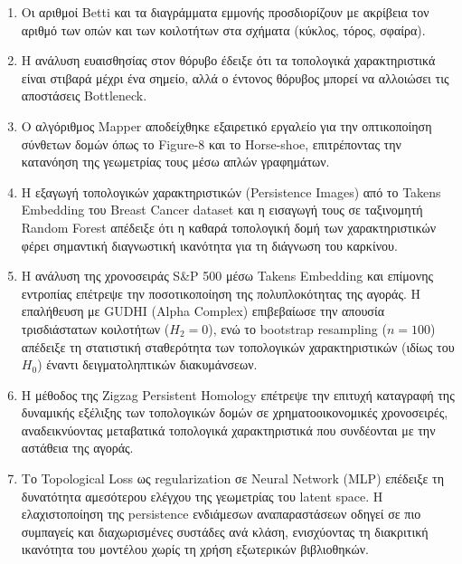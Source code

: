 \documentclass[12pt]{article}
\newcommand{\en}[1]{\foreignlanguage{english}{#1}}
\begin{document}
\begin{enumerate}
    \item Οι αριθμοί \foreignlanguage{english}{Betti} και τα διαγράμματα εμμονής προσδιορίζουν με ακρίβεια τον αριθμό των οπών και των κοιλοτήτων στα σχήματα (κύκλος, τόρος, σφαίρα).
    \item Η ανάλυση ευαισθησίας στον θόρυβο έδειξε ότι τα τοπολογικά χαρακτηριστικά είναι στιβαρά μέχρι ένα σημείο, αλλά ο έντονος θόρυβος μπορεί να αλλοιώσει τις αποστάσεις \foreignlanguage{english}{Bottleneck}.
    \item Ο αλγόριθμος \foreignlanguage{english}{Mapper} αποδείχθηκε εξαιρετικό εργαλείο για την οπτικοποίηση σύνθετων δομών όπως το \foreignlanguage{english}{Figure-8} και το \foreignlanguage{english}{Horse-shoe}, επιτρέποντας την κατανόηση της γεωμετρίας τους μέσω απλών γραφημάτων.
    \item Η εξαγωγή τοπολογικών χαρακτηριστικών (\foreignlanguage{english}{Persistence Images}) από το \foreignlanguage{english}{Takens Embedding} του \foreignlanguage{english}{Breast Cancer dataset} και η εισαγωγή τους σε ταξινομητή \foreignlanguage{english}{Random Forest} απέδειξε ότι η καθαρά τοπολογική δομή των χαρακτηριστικών φέρει σημαντική διαγνωστική ικανότητα για τη διάγνωση του καρκίνου.
    \item Η ανάλυση της χρονοσειράς \foreignlanguage{english}{S\&P 500} μέσω \foreignlanguage{english}{Takens Embedding} και επίμονης εντροπίας επέτρεψε την ποσοτικοποίηση της πολυπλοκότητας της αγοράς. Η επαλήθευση με \foreignlanguage{english}{GUDHI} (\foreignlanguage{english}{Alpha Complex}) επιβεβαίωσε την απουσία τρισδιάστατων κοιλοτήτων ($H_2=0$), ενώ το \foreignlanguage{english}{bootstrap resampling} ($n=100$) απέδειξε τη στατιστική σταθερότητα των τοπολογικών χαρακτηριστικών (ιδίως του $H_0$) έναντι δειγματοληπτικών διακυμάνσεων.
    \item Η μέθοδος της \foreignlanguage{english}{Zigzag Persistent Homology} επέτρεψε την επιτυχή καταγραφή της δυναμικής εξέλιξης των τοπολογικών δομών σε χρηματοοικονομικές χρονοσειρές, αναδεικνύοντας μεταβατικά τοπολογικά χαρακτηριστικά που συνδέονται με την αστάθεια της αγοράς.
    \item Το \en{Topological Loss} ως \en{regularization} σε \en{Neural Network} (\en{MLP}) επέδειξε τη δυνατότητα αμεσότερου ελέγχου της γεωμετρίας του \en{latent space}. Η ελαχιστοποίηση της \en{persistence} ενδιάμεσων αναπαραστάσεων οδηγεί σε πιο συμπαγείς και διαχωρισμένες συστάδες ανά κλάση, ενισχύοντας τη διακριτική ικανότητα του μοντέλου χωρίς τη χρήση εξωτερικών βιβλιοθηκών.
\end{enumerate}
\end{document}
